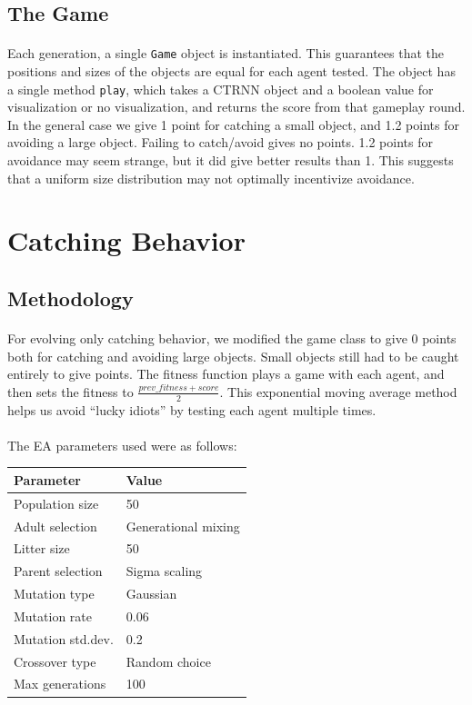 \documentclass[a4paper,12pt]{article}
\begin{document}
\subsection{The Game}
\paragraph{}Each generation, a single \texttt{Game} object is instantiated. This guarantees that the positions and sizes of the objects are equal for each agent tested. The object has a single method \texttt{play}, which takes a CTRNN object and a boolean value for visualization or no visualization, and returns the score from that gameplay round. In the general case we give 1 point for catching a small object, and 1.2 points for avoiding a large object. Failing to catch/avoid gives no points. 1.2 points for avoidance may seem strange, but it did give better results than 1. This suggests that a uniform size distribution may not optimally incentivize avoidance.

\section{Catching Behavior}
\subsection{Methodology}
\paragraph{}For evolving only catching behavior, we modified the game class to give 0 points both for catching and avoiding large objects. Small objects still had to be caught entirely to give points. The fitness function plays a game with each agent, and then sets the fitness to $\frac{prev\_fitness + score}{2}$. This exponential moving average method helps us avoid ``lucky idiots'' by testing each agent multiple times.
\paragraph{}The EA parameters used were as follows:\\
\begin{tabular}{ll}
\hline
Parameter & Value \\
\hline \hline
Population size & 50 \\
Adult selection & Generational mixing \\
Litter size & 50 \\
Parent selection & Sigma scaling \\
Mutation type & Gaussian \\
Mutation rate & 0.06 \\
Mutation std.dev. & 0.2 \\
Crossover type & Random choice \\
Max generations & 100 \\
\hline
\end{tabular}
\end{document}
